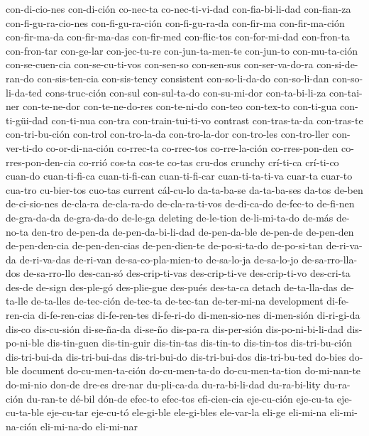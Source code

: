 {  con-di-cio-nes con-di-ción co-nec-ta co-nec-ti-vi-dad
  con-fia-bi-li-dad con-fian-za con-fi-gu-ra-cio-nes con-fi-gu-ra-ción
  con-fi-gu-ra-da con-fir-ma con-fir-ma-ción con-fir-ma-da
  con-fir-ma-das con-fir-med con-flic-tos con-for-mi-dad con-fron-ta
  con-fron-tar con-ge-lar con-jec-tu-re con-jun-ta-men-te con-jun-to
  con-mu-ta-ción con-se-cuen-cia con-se-cu-ti-vos con-sen-so
  con-sen-sus con-ser-va-do-ra con-si-de-ran-do con-sis-ten-cia
  con-sis-tency consistent con-so-li-da-do con-so-li-dan
  con-so-li-da-ted cons-truc-ción con-sul con-sul-ta-do con-su-mi-dor
  con-ta-bi-li-za con-tai-ner con-te-ne-dor con-te-ne-do-res
  con-te-ni-do con-teo con-tex-to con-ti-gua con-ti-güi-dad con-ti-nua
  con-tra con-train-tui-ti-vo contrast con-tras-ta-da con-tras-te
  con-tri-bu-ción con-trol con-tro-la-da con-tro-la-dor con-tro-les
  con-tro-ller con-ver-ti-do co-or-di-na-ción co-rrec-ta co-rrec-tos
  co-rre-la-ción co-rres-pon-den co-rres-pon-den-cia co-rrió cos-ta
  cos-te co-tas cru-dos crunchy crí-ti-ca crí-ti-co cuan-do
  cuan-ti-fi-ca cuan-ti-fi-can cuan-ti-fi-car cuan-ti-ta-ti-va cuar-ta
  cuar-to cua-tro cu-bier-tos cuo-tas current cál-cu-lo da-ta-ba-se
  da-ta-ba-ses da-tos de-ben de-ci-sio-nes de-cla-ra de-cla-ra-do
  de-cla-ra-ti-vos de-di-ca-do de-fec-to de-fi-nen de-gra-da-da
  de-gra-da-do de-le-ga deleting de-le-tion de-li-mi-ta-do de-más
  de-no-ta den-tro de-pen-da de-pen-da-bi-li-dad de-pen-da-ble
  de-pen-de de-pen-den de-pen-den-cia de-pen-den-cias de-pen-dien-te
  de-po-si-ta-do de-po-si-tan de-ri-va-da de-ri-va-das de-ri-van
  de-sa-co-pla-mien-to de-sa-lo-ja de-sa-lo-jo de-sa-rro-lla-dos
  de-sa-rro-llo des-can-só des-crip-ti-vas des-crip-ti-ve
  des-crip-ti-vo des-cri-ta des-de de-sign des-ple-gó des-plie-gue
  des-pués des-ta-ca detach de-ta-lla-das de-ta-lle de-ta-lles
  de-tec-ción de-tec-ta de-tec-tan de-ter-mi-na development
  di-fe-ren-cia di-fe-ren-cias di-fe-ren-tes di-fe-ri-do di-men-sio-nes
  di-men-sión di-ri-gi-da dis-co dis-cu-sión di-se-ña-da di-se-ño
  dis-pa-ra dis-per-sión dis-po-ni-bi-li-dad dis-po-ni-ble dis-tin-guen
  dis-tin-guir dis-tin-tas dis-tin-to dis-tin-tos dis-tri-bu-ción
  dis-tri-bui-da dis-tri-bui-das dis-tri-bui-do dis-tri-bui-dos
  dis-tri-bu-ted do-bies do-ble document do-cu-men-ta-ción
  do-cu-men-ta-do do-cu-men-ta-tion do-mi-nan-te do-mi-nio don-de
  dre-es dre-nar du-pli-ca-da du-ra-bi-li-dad du-ra-bi-lity du-ra-ción
  du-ran-te dé-bil dón-de efec-to efec-tos efi-cien-cia eje-cu-ción
  eje-cu-ta eje-cu-ta-ble eje-cu-tar eje-cu-tó ele-gi-ble ele-gi-bles
  ele-var-la eli-ge eli-mi-na eli-mi-na-ción eli-mi-na-do eli-mi-nar
}
